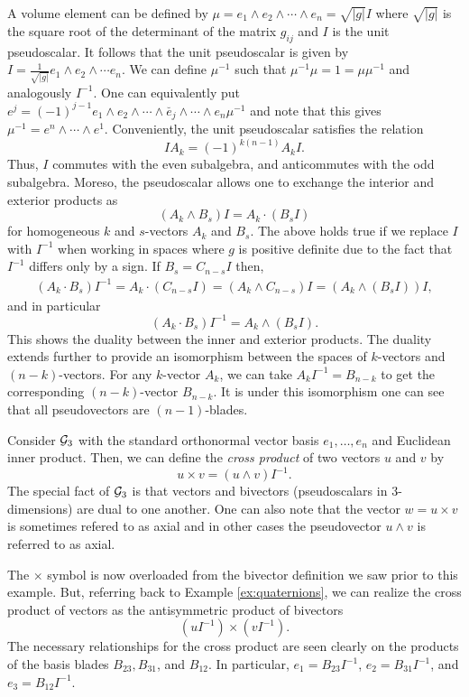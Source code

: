 A volume element can be defined by $\mu=e_1 \wedge e_2 \wedge \cdots \wedge e_n = \sqrt{|g|} I$ where $\sqrt{|g|}$ is the square root of the determinant of the matrix $g_{ij}$ and $I$ is the unit pseudoscalar. It follows that the unit pseudoscalar is given by $I=\frac{1}{\sqrt{|g|}} e_1 \wedge e_2 \wedge \cdots e_n$. We can define $\mu^{-1}$ such that $\mu^{-1}\mu = 1 = \mu \mu^{-1}$ and analogously $I^{-1}$.  One can equivalently put $e^j = (-1)^{j-1} e_1 \wedge e_2 \wedge \cdots \wedge \breve{e_j} \wedge \cdots \wedge e_n \mu^{-1}$ and note that this gives $\mu^{-1} = e^n \wedge \cdots \wedge e^1$.  Conveniently, the unit pseudoscalar satisfies the relation
\[
IA_k = (-1)^{k(n-1)} A_k I.
\]
Thus, $I$ commutes with the even subalgebra, and anticommutes with the odd subalgebra.  Moreso, the pseudoscalar allows one to exchange the interior and exterior products as
\begin{equation}
\label{eq:wedge_to_dot}
 (A_k \wedge B_s) I = A_k \cdot (B_s I)
\end{equation}
for homogeneous $k$ and $s$-vectors $A_k$ and $B_s$. The above holds true if we replace $I$ with $I^{-1}$ when working in spaces where $g$ is positive definite due to the fact that $I^{-1}$ differs only by a sign. If $B_s = C_{n-s}I$ then,
\begin{align*}
 (A_k \cdot B_s)I^{-1} = A_k \cdot (C_{n-s}I) = (A_k \wedge C_{n-s})I = (A_k \wedge (B_sI))I,
\end{align*}
and in particular
\begin{equation}
\label{eq:dot_to_wedge}
    (A_k \cdot B_s)I^{-1} = A_k \wedge (B_s I).
\end{equation}
This shows the duality between the inner and exterior products. The duality extends further to provide an isomorphism between the spaces of $k$-vectors and $(n-k)$-vectors. For any $k$-vector $A_k$, we can take $A_k I^{-1}=B_{n-k}$ to get the corresponding $(n-k)$-vector $B_{n-k}$. It is under this isomorphism one can see that all pseudovectors are $(n-1)$-blades. 

\begin{example}
Consider $\mathcal{G}_3$ with the standard orthonormal vector basis $e_1,\dots,e_n$ and Euclidean inner product.  Then, we can define the \emph{cross product} of two vectors $u$ and $v$ by
\[
u \times v = (u\wedge v)I^{-1}.
\]
The special fact of $\mathcal{G}_3$ is that vectors and bivectors (pseudoscalars in 3-dimensions) are dual to one another. One can also note that the vector $w=u\times v$ is sometimes refered to as axial and in other cases the pseudovector $u\wedge v$ is referred to as axial. 

The $\times$ symbol is now overloaded from the bivector definition we saw prior to this example.  But, referring back to Example \ref{ex:quaternions}, we can realize the cross product of vectors as the antisymmetric product of bivectors
\[
(uI^{-1})\times (vI^{-1}). 
\]
The necessary relationships for the cross product are seen clearly on the products of the basis blades $B_{23}, B_{31}$, and $B_{12}$. In particular, $e_1 = B_{23}I^{-1}$, $e_2 = B_{31} I^{-1}$, and $e_3 = B_{12} I^{-1}$.
\end{example}

